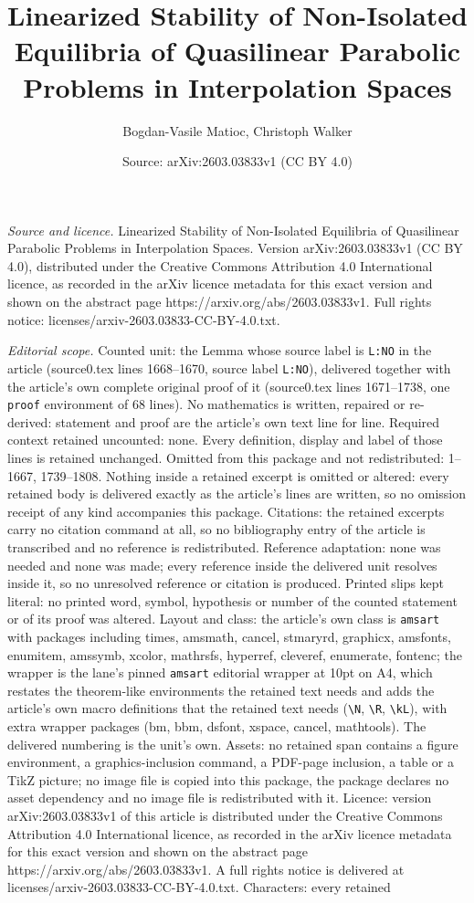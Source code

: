 \documentclass[10pt,a4paper]{amsart}
\title[Linearized Stability of Non-Isolated Equilibria of Quasiline]{Linearized Stability of Non-Isolated Equilibria of Quasilinear Parabolic Problems in Interpolation Spaces}
\author{Bogdan-Vasile Matioc, Christoph Walker}
\date{Source: arXiv:2603.03833v1 (CC BY 4.0)}
\begin{document}
\maketitle

\noindent\emph{Source and licence.} Linearized Stability of Non-Isolated Equilibria of Quasilinear Parabolic Problems in Interpolation Spaces. Version arXiv:2603.03833v1 (CC BY 4.0), distributed under the Creative Commons Attribution 4.0 International licence, as recorded in the arXiv licence metadata for this exact version and shown on the abstract page https://arxiv.org/abs/2603.03833v1. Full rights notice: licenses/arxiv-2603.03833-CC-BY-4.0.txt.\par\smallskip

\noindent\textit{Editorial scope.} Counted unit: the Lemma whose source label is \texttt{L:NO} in the article (source0.tex lines 1668--1670, source label \texttt{L:NO}), delivered together with the article's own complete original proof of it (source0.tex lines 1671--1738, one \texttt{proof} environment of 68 lines). No mathematics is written, repaired or re-derived: statement and proof are the article's own text line for line. Required context retained uncounted: none. Every definition, display and label of those lines is retained unchanged. Omitted from this package and not redistributed: 1--1667, 1739--1808. Nothing inside a retained excerpt is omitted or altered: every retained body is delivered exactly as the article's lines are written, so no omission receipt of any kind accompanies this package. Citations: the retained excerpts carry no citation command at all, so no bibliography entry of the article is transcribed and no reference is redistributed. Reference adaptation: none was needed and none was made; every reference inside the delivered unit resolves inside it, so no unresolved reference or citation is produced. Printed slips kept literal: no printed word, symbol, hypothesis or number of the counted statement or of its proof was altered. Layout and class: the article's own class is \texttt{amsart} with packages including times, amsmath, cancel, stmaryrd, graphicx, amsfonts, enumitem, amssymb, xcolor, mathrsfs, hyperref, cleveref, enumerate, fontenc; the wrapper is the lane's pinned \texttt{amsart} editorial wrapper at 10pt on A4, which restates the theorem-like environments the retained text needs and adds the article's own macro definitions that the retained text needs (\texttt{\textbackslash N}, \texttt{\textbackslash R}, \texttt{\textbackslash kL}), with extra wrapper packages (bm, bbm, dsfont, xspace, cancel, mathtools). The delivered numbering is the unit's own. Assets: no retained span contains a figure environment, a graphics-inclusion command, a PDF-page inclusion, a table or a TikZ picture; no image file is copied into this package, the package declares no asset dependency and no image file is redistributed with it. Licence: version arXiv:2603.03833v1 of this article is distributed under the Creative Commons Attribution 4.0 International licence, as recorded in the arXiv licence metadata for this exact version and shown on the abstract page https://arxiv.org/abs/2603.03833v1. A full rights notice is delivered at licenses/arxiv-2603.03833-CC-BY-4.0.txt. Characters: every retained 
\end{document}
